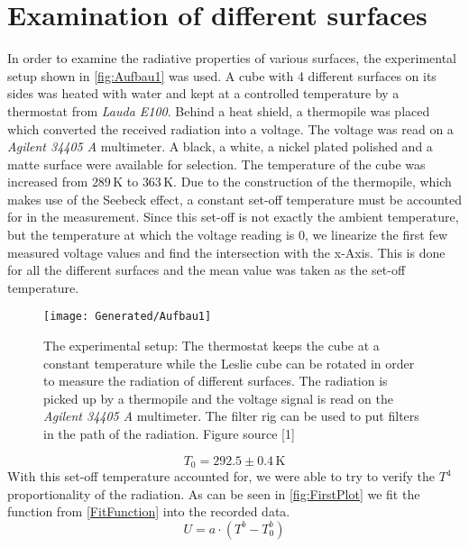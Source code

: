 \documentclass[a4paper,10pt,twocolumn]{article}
\begin{document}
    \section{Examination of different surfaces}\label{sec:ExaminationOfDifferentSurfaces}
    In order to examine the radiative properties of various surfaces, the experimental setup shown in \autoref{fig:Aufbau1} was used.
    A cube with 4 different surfaces on its sides was heated with water and kept at a controlled temperature by a thermostat from \textit{Lauda E100}.
    Behind a heat shield, a thermopile was placed which converted the received radiation into a voltage.
    The voltage was read on a \textit{Agilent 34405 A} multimeter.
    A black, a white, a nickel plated polished and a matte surface were available for selection.
    The temperature of the cube was increased from $ 289\,$K to $363\,$K.
    Due to the construction of the thermopile, which makes use of the Seebeck effect, a constant set-off temperature must be accounted for in the measurement.
    Since this set-off is not exactly the ambient temperature, but the temperature at which the voltage reading is $0$, we linearize the first few measured voltage values 
    and find the intersection with the x-Axis.
    This is done for all the different surfaces and the mean value was taken as the set-off temperature.
    \begin{figure}
        \begin{center}
            \texttt{[image: Generated/Aufbau1]}
            \caption{The experimental setup: The thermostat keeps the cube at a constant temperature while the Leslie 
            cube can be rotated in order to measure the radiation of different surfaces.
            The radiation is picked up by a thermopile and the voltage signal is read on the \textit{Agilent 34405 A} multimeter.
            The filter rig can be used to put filters in the path of the radiation.
            Figure source [1]}
            \label{fig:Aufbau1}
        \end{center}
    \end{figure}
    \begin{equation}\label{SetofTemp}
        T_0 = 292.5 \pm 0.4 \,\text{K}
    \end{equation}
    With this set-off temperature accounted for, we were able to try to verify the $T^4$ proportionality of the radiation.
    As can be seen in \autoref{fig:FirstPlot} we fit the function from \autoref{FitFunction} into the recorded data.
    \begin{equation}\label{FitFunction}
        U = a\cdot (T^b - T_0^b)
    \end{equation}
    
\end{document}
